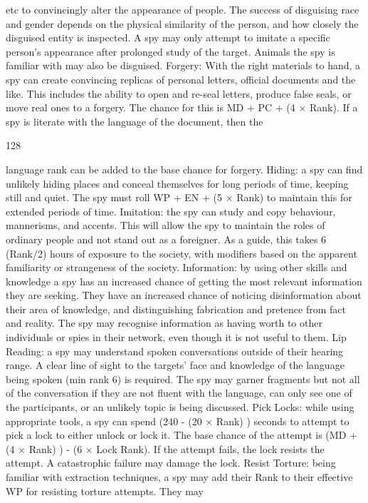 \documentclass[a4paper]{article}
\begin{document}
\begin{multicols}{3}
etc to convincingly alter the appearance of people.
The success of disguising race and gender depends
on the physical similarity of the person, and how
closely the disguised entity is inspected. A spy may
only attempt to imitate a specific person’s appearance after prolonged study of the target. Animals
the spy is familiar with may also be disguised.
Forgery: With the right materials to hand, a spy
can create convincing replicas of personal letters,
official documents and the like. This includes the
ability to open and re-seal letters, produce false
seals, or move real ones to a forgery. The chance
for this is MD + PC + (4 × Rank). If a spy is literate with the language of the document, then the

128

language rank can be added to the base chance for
forgery.
Hiding: a spy can find unlikely hiding places and
conceal themselves for long periods of time, keeping still and quiet. The spy must roll WP + EN + (5
× Rank) to maintain this for extended periods of
time.
Imitation: the spy can study and copy behaviour,
mannerisms, and accents. This will allow the spy to
maintain the roles of ordinary people and not stand
out as a foreigner. As a guide, this takes 6 (Rank/2) hours of exposure to the society, with
modifiers based on the apparent familiarity or
strangeness of the society.
Information: by using other skills and knowledge
a spy has an increased chance of getting the most
relevant information they are seeking. They have
an increased chance of noticing disinformation
about their area of knowledge, and distinguishing
fabrication and pretence from fact and reality. The
spy may recognise information as having worth to
other individuals or spies in their network, even
though it is not useful to them.
Lip Reading: a spy may understand spoken conversations outside of their hearing range. A clear
line of sight to the targets’ face and knowledge of
the language being spoken (min rank 6) is required.
The spy may garner fragments but not all of the
conversation if they are not fluent with the language, can only see one of the participants, or an
unlikely topic is being discussed.
Pick Locks: while using appropriate tools, a spy
can spend (240 - (20 × Rank) ) seconds to attempt
to pick a lock to either unlock or lock it. The base
chance of the attempt is (MD + (4 × Rank) ) - (6 ×
Lock Rank). If the attempt fails, the lock resists the
attempt. A catastrophic failure may damage the
lock.
Resist Torture: being familiar with extraction
techniques, a spy may add their Rank to their effective WP for resisting torture attempts. They may

\end{multicols}
\end{document}
